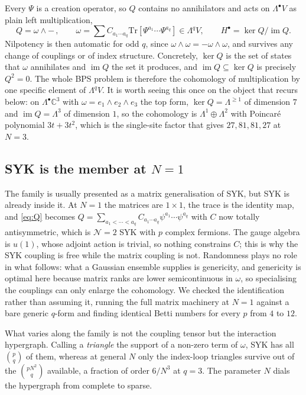\documentclass[10pt]{article}
\newcommand{\Tr}{\mathrm{Tr}}
\begin{document}
Every $\Psi$ is a creation operator, so $Q$ contains no annihilators and acts on $\Lambda^\bullet V$ as plain
left multiplication,
\begin{equation}
Q=\omega\wedge-\,,\qquad \omega=\sum C_{a_1\cdots a_q}\Tr[\Psi^{a_1}\cdots\Psi^{a_q}]\in\Lambda^qV,
\qquad H^\bullet=\ker Q/\operatorname{im}Q .
\label{eq:wedge}
\end{equation}
Nilpotency is then automatic for odd $q$, since $\omega\wedge\omega=-\omega\wedge\omega$, and survives any
change of couplings or of index structure. Concretely, $\ker Q$ is the set of states that $\omega$ annihilates
and $\operatorname{im}Q$ the set it produces, and $\operatorname{im}Q\subseteq\ker Q$ is precisely $Q^2=0$. The
whole BPS problem is therefore the cohomology of multiplication by one specific element of $\Lambda^qV$. It is
worth seeing this once on the object that recurs below: on $\Lambda^\bullet\mathbb C^3$ with
$\omega=e_1\wedge e_2\wedge e_3$ the top form, $\ker Q=\Lambda^{\ge1}$ of dimension $7$ and
$\operatorname{im}Q=\Lambda^3$ of dimension $1$, so the cohomology is $\Lambda^1\oplus\Lambda^2$ with Poincar\'e
polynomial $3t+3t^2$, which is the single-site factor that gives $27,81,81,27$ at $N=3$.

\subsection{SYK is the member at $N=1$}

The family is usually presented as a matrix generalisation of SYK, but SYK is already inside it. At $N=1$ the
matrices are $1\times1$, the trace is the identity map, and \eqref{eq:Q} becomes
$Q=\sum_{a_1<\cdots<a_q}C_{a_1\cdots a_q}\psi^{a_1}\cdots\psi^{a_q}$ with $C$ now totally antisymmetric, which
is $\mathcal N=2$ SYK with $p$ complex fermions. The gauge algebra is $u(1)$, whose adjoint action is trivial,
so nothing constrains $C$; this is why the SYK coupling is free while the matrix coupling is not. Randomness
plays no role in what follows: what a Gaussian ensemble supplies is genericity, and genericity is optimal here
because matrix ranks are lower semicontinuous in $\omega$, so specialising the couplings can only enlarge the
cohomology. We checked the identification rather than assuming it, running the full matrix machinery at $N=1$
against a bare generic $q$-form and finding identical Betti numbers for every $p$ from $4$ to $12$.

What varies along the family is not the coupling tensor but the interaction hypergraph. Calling a
\emph{triangle} the support of a non-zero term of $\omega$, SYK has all $\binom pq$ of them, whereas at general
$N$ only the index-loop triangles survive out of the $\binom{pN^2}{q}$ available, a fraction of order $6/N^3$ at
$q=3$. The parameter $N$ dials the hypergraph from complete to sparse.
\end{document}
